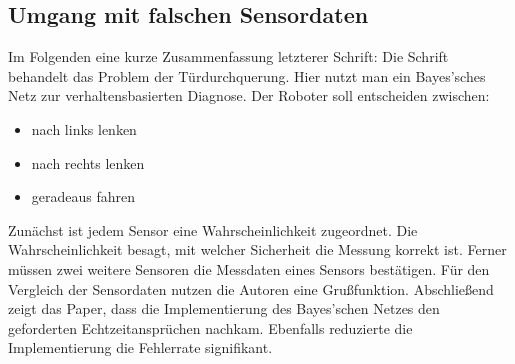 \subsection{Umgang mit falschen Sensordaten}
Im Folgenden eine kurze Zusammenfassung letzterer Schrift: Die Schrift behandelt das Problem der Türdurchquerung. Hier nutzt man ein Bayes'sches Netz zur verhaltensbasierten Diagnose. Der Roboter soll entscheiden zwischen:
\begin{itemize}
\item nach links lenken
\item nach rechts lenken
\item geradeaus fahren
\end{itemize}
Zunächst ist jedem Sensor eine Wahrscheinlichkeit zugeordnet. Die Wahrscheinlichkeit besagt, mit welcher Sicherheit die Messung korrekt ist. Ferner müssen zwei weitere Sensoren die Messdaten eines Sensors bestätigen. Für den Vergleich der Sensordaten nutzen die Autoren eine Grußfunktion. 
Abschließend zeigt das Paper, dass die Implementierung des Bayes'schen Netzes den geforderten Echtzeitansprüchen nachkam. Ebenfalls reduzierte die Implementierung die Fehlerrate signifikant.  





